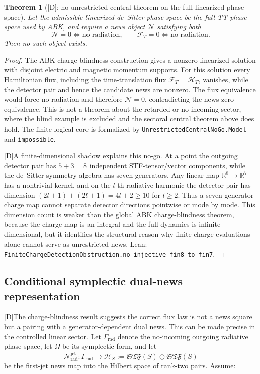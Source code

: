 \documentclass[11pt,a4paper]{article}
\newtheorem{theorem}{Theorem}[section]
\newcommand{\cH}{\mathcal{H}}
\newcommand{\cN}{\mathcal{N}}
\newcommand{\statusD}{\textsf{[D]}}
\begin{document}
\begin{theorem}[\statusD: no unrestricted central theorem on the full linearized phase space]
Let the admissible linearized de~Sitter phase space be the full TT phase space used by ABK, and require a news object \(\mathcal N\) satisfying both
\[
  \mathcal N=0\iff\text{no radiation},
  \qquad
  \mathcal F_T=0\iff\text{no radiation}.
\]
Then no such object exists.
\end{theorem}
\begin{proof}
The ABK charge-blindness construction gives a nonzero linearized solution with disjoint electric and magnetic momentum supports.  For this solution every Hamiltonian flux, including the time-translation flux \(\mathcal F_T=\mathcal H_T\), vanishes, while the detector pair and hence the candidate news are nonzero.  The flux equivalence would force no radiation and therefore \(\mathcal N=0\), contradicting the news-zero equivalence.  This is not a theorem about the retarded or no-incoming sector, where the blind example is excluded and the sectoral central theorem above does hold.  The finite logical core is formalized by \texttt{UnrestrictedCentralNoGo.Model} and \texttt{impossible}.

\statusD A finite-dimensional shadow explains this no-go.  At a point the outgoing detector pair has \(5+3=8\) independent STF-tensor/vector components, while the de~Sitter symmetry algebra has seven generators.  Any linear map \(\mathbb R^8\to\mathbb R^7\) has a nontrivial kernel, and on the \(l\)-th radiative harmonic the detector pair has dimension \((2l+1)+(2l+1)=4l+2\ge10\) for \(l\ge2\).  Thus a seven-generator charge map cannot separate detector directions pointwise or mode by mode.  This dimension count is weaker than the global ABK charge-blindness theorem, because the charge map is an integral and the full dynamics is infinite-dimensional, but it identifies the structural reason why finite charge evaluations alone cannot serve as unrestricted news.  Lean: \texttt{FiniteChargeDetectionObstruction.no\_injective\_fin8\_to\_fin7}.
\end{proof}

\subsection{Conditional symplectic dual-news representation}

\statusD The charge-blindness result suggests the correct flux law is not a news square but a pairing with a generator-dependent dual news.  This can be made precise in the controlled linear sector.  Let \(\Gamma_{\mathrm{rad}}\) denote the no-incoming outgoing radiative phase space, let \(\Omega\) be its symplectic form, and let
\begin{equation}
  \cN^{\mathrm{jet}}_{\mathrm{rad}}\colon \Gamma_{\mathrm{rad}}\longrightarrow \cH_S
  :=
  \mathfrak{STF}(S)\oplus\mathfrak{STF}(S)
\end{equation}
be the first-jet news map into the Hilbert space of rank-two pairs.  Assume:
\end{document}
